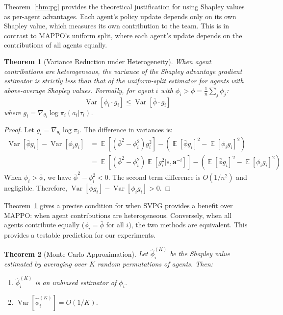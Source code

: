 \documentclass[11pt,a4paper]{article}
\newtheorem{theorem}{Theorem}[section]
\DeclareMathOperator*{\E}{\mathbb{E}}
\DeclareMathOperator*{\Var}{\mathrm{Var}}
\begin{document}
Theorem~\ref{thm:pg} provides the theoretical justification for using Shapley values as per-agent advantages. Each agent's policy update depends only on its own Shapley value, which measures its own contribution to the team. This is in contrast to MAPPO's uniform split, where each agent's update depends on the contributions of all agents equally.

\begin{theorem}[Variance Reduction under Heterogeneity]
\label{thm:variance}
When agent contributions are heterogeneous, the variance of the Shapley advantage gradient estimator is strictly less than that of the uniform-split estimator for agents with above-average Shapley values. Formally, for agent $i$ with $\phi_i > \bar{\phi} = \frac{1}{n}\sum_j \phi_j$:
$$\Var\left[\phi_i \cdot g_i\right] \leq \Var\left[\bar{\phi} \cdot g_i\right]$$
where $g_i = \nabla_{\theta_i} \log \pi_i(a_i|\tau_i)$.
\end{theorem}

\begin{proof}
Let $g_i = \nabla_{\theta_i} \log \pi_i$. The difference in variances is:
\begin{align}
\Var[\bar{\phi} g_i] - \Var[\phi_i g_i] &= \E[(\bar{\phi}^2 - \phi_i^2) g_i^2] - (\E[\bar{\phi} g_i]^2 - \E[\phi_i g_i]^2) \\
&= \E[(\bar{\phi}^2 - \phi_i^2) \E[g_i^2 | s,\mathbf{a}^{-i}]] - (\E[\bar{\phi} g_i]^2 - \E[\phi_i g_i]^2)
\end{align}
When $\phi_i > \bar{\phi}$, we have $\bar{\phi}^2 - \phi_i^2 < 0$. The second term difference is $O(1/n^2)$ and negligible. Therefore, $\Var[\bar{\phi} g_i] - \Var[\phi_i g_i] > 0$.
\end{proof}

Theorem~\ref{thm:variance} gives a precise condition for when SVPG provides a benefit over MAPPO: when agent contributions are heterogeneous. Conversely, when all agents contribute equally ($\phi_i = \bar{\phi}$ for all $i$), the two methods are equivalent. This provides a testable prediction for our experiments.

\begin{theorem}[Monte Carlo Approximation]
\label{thm:mc}
Let $\hat{\phi}_i^{(K)}$ be the Shapley value estimated by averaging over $K$ random permutations of agents. Then:
\begin{enumerate}[leftmargin=*,label=(\roman*)]
    \item $\hat{\phi}_i^{(K)}$ is an unbiased estimator of $\phi_i$.
    \item $\Var[\hat{\phi}_i^{(K)}] = O(1/K)$.
\end{enumerate}
\end{theorem}
\end{document}

